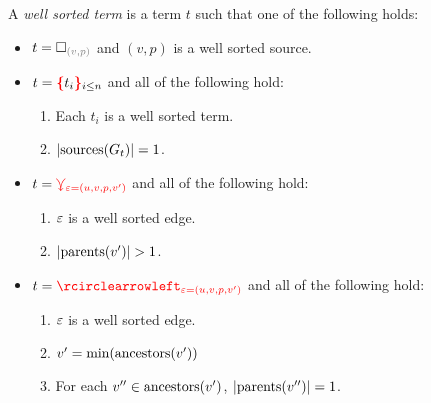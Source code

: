 \begin{definition}
  A \emph{well sorted term} is a term $t$ such that one of the following holds:
  \begin{itemize}

    \item $t = \emptyHole{v}{p}$ and $(v, p)$ is a well sorted source.

    \item $t = \conflictHole[i \leq n]{t_i}$ and all of the following hold:
      \begin{enumerate}
        \item Each $t_i$ is a well sorted term.
        \item $\left\lvert\text{sources}\mathopen{}\left(G_t\right)\mathclose{}\right\rvert = 1$.
      \end{enumerate}

    \item $t = \textcolor{red}{\curlyveedownarrow_{\varepsilon{=}(u, v, p, v')}}$ and all of the following hold:
      \begin{enumerate}
        \item $\varepsilon$ is a well sorted edge.
        \item $\left\lvert\operatorname{\text{parents}}\mathopen{}\left(v'\right)\mathclose{}\right\rvert > 1$.
      \end{enumerate}

    \item $t = \cycleVertex{\e{=}(u, v, p, v')}$ and all of the following hold:
      \begin{enumerate}
        \item $\varepsilon$ is a well sorted edge.
        \item $v' = \operatorname{\text{min}}\mathopen{}\left(\operatorname{\text{ancestors}}\mathopen{}\left(v'\right)\mathclose{}\right)\mathclose{}$
        \item For each $v'' \in \operatorname{\text{ancestors}}\mathopen{}\left(v'\right)\mathclose{}$, $\left\lvert\operatorname{\text{parents}}\mathopen{}\left(v''\right)\mathclose{}\right\rvert = 1$.
      \end{enumerate}


\end{itemize}
\end{definition}
